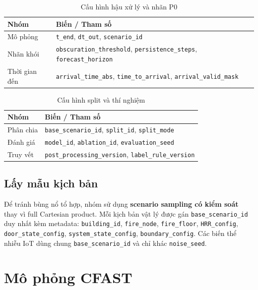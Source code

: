 \begin{table}[H]
\centering
\caption{Cấu hình hậu xử lý và nhãn P0}
\label{tab:factorLabel}
\begin{tabularx}{\textwidth}{l X}
\toprule
\textbf{Nhóm} & \textbf{Biến / Tham số} \\
\midrule
Mô phỏng & \texttt{t\_end}, \texttt{dt\_out}, \texttt{scenario\_id} \\
Nhãn khói & \texttt{obscuration\_threshold}, \texttt{persistence\_steps}, \texttt{forecast\_horizon} \\
Thời gian đến & \texttt{arrival\_time\_abs}, \texttt{time\_to\_arrival}, \texttt{arrival\_valid\_mask} \\
\bottomrule
\end{tabularx}
\end{table}

\begin{table}[H]
\centering
\caption{Cấu hình split và thí nghiệm}
\label{tab:factorExperiment}
\begin{tabularx}{\textwidth}{l X}
\toprule
\textbf{Nhóm} & \textbf{Biến / Tham số} \\
\midrule
Phân chia & \texttt{base\_scenario\_id}, \texttt{split\_id}, \texttt{split\_mode} \\
Đánh giá & \texttt{model\_id}, \texttt{ablation\_id}, \texttt{evaluation\_seed} \\
Truy vết & \texttt{post\_processing\_version}, \texttt{label\_rule\_version} \\
\bottomrule
\end{tabularx}
\end{table}

\subsection{Lấy mẫu kịch bản}

Để tránh bùng nổ tổ hợp, nhóm sử dụng \textbf{scenario sampling có kiểm soát} thay vì full Cartesian product. Mỗi kịch bản vật lý được gán \texttt{base\_scenario\_id} duy nhất kèm metadata: \texttt{building\_id}, \texttt{fire\_node}, \texttt{fire\_floor}, \texttt{HRR\_config}, \texttt{door\_state\_config}, \texttt{system\_state\_config}, \texttt{boundary\_config}. Các biến thể nhiễu IoT dùng chung \texttt{base\_scenario\_id} và chỉ khác \texttt{noise\_seed}.

\section{Mô phỏng CFAST}
\label{sec:cfastmethod}

